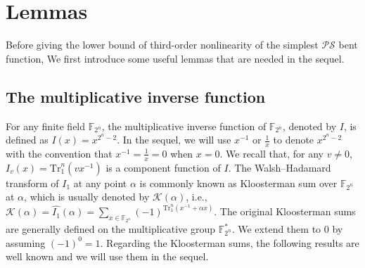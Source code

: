 \documentclass{article}
\newcommand{\F}{\mathbb{F}}
\newtheorem{lemma}{Lemma}
\newtheorem{remark}{Remark}
\theoremstyle{nonumberplain}
\newcommand{\0}{\textbf{0}}
\newcommand{\1}{\textbf{1}}
\begin{document}

\section{Lemmas}
Before giving the lower bound of third-order nonlinearity of the simplest $ \mathcal{PS} $ bent function, 
We first introduce some useful lemmas that are needed in the sequel.

\subsection{The multiplicative inverse function}
For any finite field $\F_{2^n}$, the multiplicative inverse function of $\F_{2^n}$, denoted by $I$, is defined as $I(x)=x^{2^n-2}$. In the sequel, we will use $x^{-1}$ or $\frac{1}{x}$ to
denote $x^{2^n-2}$ with the convention that $x^{-1}=\frac{1}{x}=0$ when $x=0$. We recall that, for any $v \neq 0$, $I_v(x) = \mathrm{Tr}_1^n(vx^{-1})$ is a component function of $I$.
The Walsh--Hadamard transform of $I_1$ at any point $\alpha$ is commonly known as Kloosterman sum over $\F_{2^n}$ at $\alpha$, which is usually denoted by $\mathcal{K}(\alpha)$,
i.e., $\mathcal{K}(\alpha)=\widehat{I_1}(\alpha)=\sum_{x\in\F_{2^n}}(-1)^{\mathrm{Tr}_1^n(x^{-1}+\alpha x)}$.
The original Kloosterman sums are generally defined on the multiplicative group $\F_{2^n}^*$. We extend them to $0$ by assuming $(-1)^0=1$. Regarding the Kloosterman sums,
the following results are well known and we will use them in the sequel.
\end{document}
